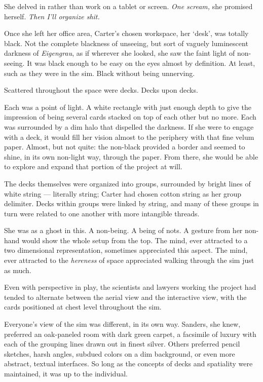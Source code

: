 She delved in rather than work on a tablet or screen. \emph{One scream,} she promised herself. \emph{Then I'll organize shit.}

Once she left her office area, Carter's chosen workspace, her `desk', was totally black. Not the complete blackness of unseeing, but sort of vaguely luminescent darkness of \emph{Eigengrau}, as if wherever she looked, she saw the faint light of non-seeing. It was black enough to be easy on the eyes almost by definition. At least, such as they were in the sim. Black without being unnerving.

Scattered throughout the space were decks. Decks upon decks.

Each was a point of light. A white rectangle with just enough depth to give the impression of being several cards stacked on top of each other but no more. Each was surrounded by a dim halo that dispelled the darkness. If she were to engage with a deck, it would fill her vision almost to the periphery with that fine velum paper. Almost, but not quite: the non-black provided a border and seemed to shine, in its own non-light way, through the paper. From there, she would be able to explore and expand that portion of the project at will.

The decks themselves were organized into groups, surrounded by bright lines of white string --- literally string; Carter had chosen cotton string as her group delimiter. Decks within groups were linked by string, and many of these groups in turn were related to one another with more intangible threads.

She was as a ghost in this. A non-being. A being of nots. A gesture from her non-hand would show the whole setup from the top. The mind, ever attracted to a two dimensional representation, sometimes appreciated this aspect. The mind, ever attracted to the \emph{hereness} of space appreciated walking through the sim just as much.

Even with perspective in play, the scientists and lawyers working the project had tended to alternate between the aerial view and the interactive view, with the cards positioned at chest level throughout the sim.

Everyone's view of the sim was different, in its own way. Sanders, she knew, preferred an oak-paneled room with dark green carpet, a facsimile of luxury with each of the grouping lines drawn out in finest silver. Others preferred pencil sketches, harsh angles, subdued colors on a dim background, or even more abstract, textual interfaces. So long as the concepts of decks and spatiality were maintained, it was up to the individual.

